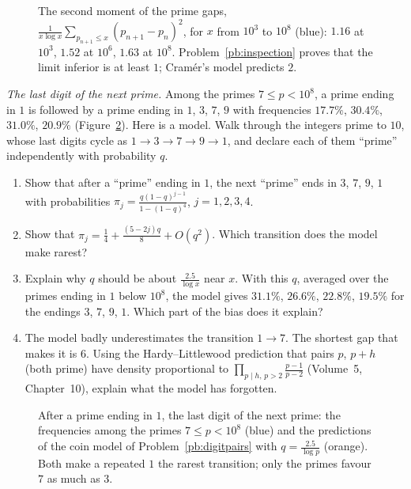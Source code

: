 \begin{figure}[ht]
\centering
{}
\caption{The second moment of the prime gaps, $\frac1{x\log x}\sum_{p_{n+1}\le x}(p_{n+1}-p_n)^2$, for $x$ from $10^3$ to $10^8$ (blue): $1.16$ at $10^3$, $1.52$ at $10^6$,
$1.63$ at $10^8$. Problem~\ref{pb:inspection} proves that the limit inferior is at least $1$; Cram\'er's model predicts $2$.}
\label{fig:gaps}
\end{figure}

\begin{exercise}[$\star\star$]\label{pb:digitpairs}
\emph{The last digit of the next prime.} Among the primes $7\le p<10^8$, a prime ending in $1$ is followed by a prime ending in $1$, $3$, $7$, $9$ with frequencies
$17.7\%$, $30.4\%$, $31.0\%$, $20.9\%$ (Figure~\ref{fig:digits}). Here is a model. Walk through the integers prime to $10$, whose last digits cycle as
$1\to3\to7\to9\to1$, and declare each of them ``prime'' independently with probability $q$.
\begin{enumerate}[label=(\alph*)]
\item Show that after a ``prime'' ending in $1$, the next ``prime'' ends in $3$, $7$, $9$, $1$ with probabilities $\pi_j=\frac{q(1-q)^{j-1}}{1-(1-q)^4}$, $j=1,2,3,4$.
\item Show that $\pi_j=\frac14+\frac{(5-2j)q}8+O(q^2)$. Which transition does the model make rarest?
\item Explain why $q$ should be about $\frac{2.5}{\log x}$ near $x$. With this $q$, averaged over the primes ending in $1$ below $10^8$, the model gives $31.1\%$, $26.6\%$, $22.8\%$, $19.5\%$
for the endings $3$, $7$, $9$, $1$. Which part of the bias does it explain?
\item The model badly underestimates the transition $1\to7$. The shortest gap that makes it is $6$. Using the Hardy--Littlewood prediction that pairs $p$, $p+h$ (both prime) have
density proportional to $\prod_{p\mid h,\,p>2}\frac{p-1}{p-2}$ (Volume~5, Chapter~10), explain what the model has forgotten.
\end{enumerate}
\end{exercise}

\begin{figure}[ht]
\centering
{}
\caption{After a prime ending in $1$, the last digit of the next prime: the frequencies among the primes $7\le p<10^8$ (blue) and the predictions of the coin model of
Problem~\ref{pb:digitpairs} with $q=\frac{2.5}{\log p}$ (orange). Both make a repeated $1$ the rarest transition; only the primes favour $7$ as much as $3$.}
\label{fig:digits}
\end{figure}

